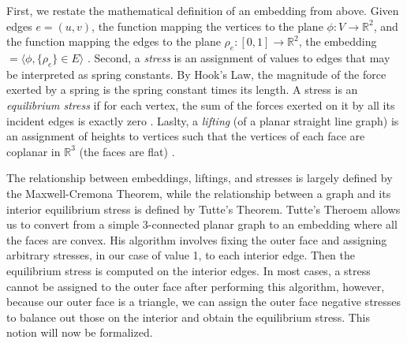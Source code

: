 \documentclass[11pt]{article}
\newcommand{\R}{\mathbb{R}}
\theoremstyle{definition}
\begin{document}
	First, we restate the mathematical definition of an embedding from above. 
	Given edges $e=(u,v)$, the function mapping the vertices to the plane $ \phi :V \rightarrow \R^2$, and the function mapping the edges to the plane $ \rho_e :[0,1] \rightarrow \R^2$, the embedding $= \langle \phi, \{\rho_e\} \in E \rangle$ \cite{mathworld:Embedding}.
	Second, a \emph{stress} is an assignment of values to edges that may be interpreted as spring constants. 
	By Hook's Law, the magnitude of the force exerted by a spring is the spring constant times its length. 
	A stress is an \emph{equilibrium stress} if for each vertex, the sum of the forces exerted on it by all its incident edges is exactly zero \cite{AresRiboMor}.
	Laslty, a \emph{lifting} (of a planar straight line graph) is an assignment of heights to vertices such that the vertices of each face are coplanar in $\R^3$ (the faces are flat) \cite{WhiteleyHandbook}.

  	The relationship between embeddings, liftings, and stresses is largely defined by the Maxwell-Cremona Theorem, while the relationship between a graph and its interior equilibrium stress is defined by Tutte's Theorem.  
	Tutte's Theroem allows us to convert from a simple 3-connected planar graph to an embedding where all the faces are convex. 
	His algorithm involves fixing the outer face and assigning arbitrary stresses, in our case of value 1, to each interior edge. 
	Then the equilibrium stress is computed on the interior edges. 
	In most cases, a stress cannot be assigned to the outer face after performing this algorithm, however, because our outer face is a triangle, we can assign the outer face negative stresses to balance out those on the interior and obtain the equilibrium stress. 
	This notion will now be formalized.
\end{document}
